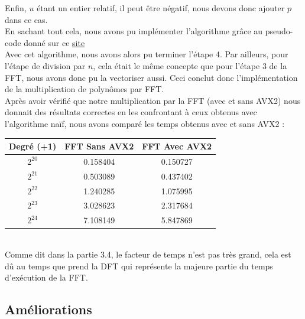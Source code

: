 \documentclass[12pt, a4paper]{article}
\begin{document}
Enfin, $u$ étant un entier relatif, il peut être négatif, nous devons donc ajouter $p$ dans ce cas. \\
\indent En sachant tout cela, nous avons pu implémenter l'algorithme grâce au pseudo-code donné sur ce \href{https://www.dcode.fr/identite-bezout}{\underline{\color{blue}site}} \\
\indent Avec cet algorithme, nous avons alors pu terminer l'étape 4. Par ailleurs, pour l'étape de division par $n$, cela était le même concepte que pour l'étape 3 de la FFT, nous avons donc pu la vectoriser aussi. Ceci conclut donc l'implémentation de la multiplication de polynômes par FFT. \\
\indent Après avoir vérifié que notre multiplication par la FFT (avec et sans AVX2) nous donnait des résultats correctes en les confrontant à ceux obtenus avec l'algorithme naïf, nous avons comparé les temps obtenus avec et sans AVX2 :

\begin{center}
\begin{tabular}{||c c c||}
\hline
Degré (+1) & FFT Sans AVX2 & FFT Avec AVX2 \\
\hline\hline
$2^{20}$ & 0.158404 & 0.150727 \\
\hline
$2^{21}$ & 0.503089 & 0.437402 \\
\hline
$2^{22}$ & 1.240285 & 1.075995 \\
\hline
$2^{23}$ & 3.028623 & 2.317684 \\
\hline
$2^{24}$ & 7.108149 & 5.847869 \\
\hline
\end{tabular}
\end{center}
{}
\ \\
\indent Comme dit dans la partie 3.4, le facteur de temps n'est pas très grand, cela est dû au temps que prend la DFT qui représente la majeure partie du temps d'exécution de la FFT.

\subsection{Améliorations}
\end{document}
